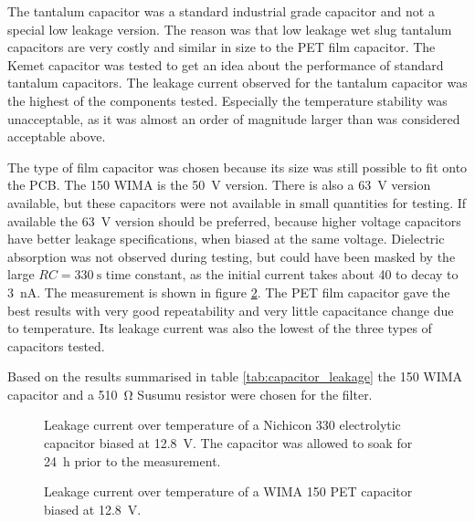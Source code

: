 The tantalum capacitor was a standard industrial grade capacitor and not a special low leakage version. The reason was that low leakage wet slug tantalum capacitors are very costly and similar in size to the PET film capacitor. The Kemet  capacitor was tested to get an idea about the performance of standard tantalum capacitors. The leakage current observed for the tantalum capacitor was the highest of the components tested. Especially the temperature stability was unacceptable, as it was almost an order of magnitude larger than was considered acceptable above.

The type of film capacitor was chosen because its size was still possible to fit onto the PCB. The \qty{150}{\uF} WIMA  is the \qty{50}{\V} version. There is also a \qty{63}{\V} version available, but these capacitors were not available in small quantities for testing. If available the \qty{63}{\V} version should be preferred, because higher voltage capacitors have better leakage specifications, when biased at the same voltage. Dielectric absorption was not observed during testing, but could have been masked by the large $RC = \qty{330}{\s}$ time constant, as the initial current takes about \qty{40}{\min} to decay to \qty{3}{\nA}. The measurement is shown in figure \ref{fig:leakage_current_mks4}. The PET film capacitor gave the best results with very good repeatability and very little capacitance change due to temperature. Its leakage current was also the lowest of the three types of capacitors tested.

Based on the results summarised in table \ref{tab:capacitor_leakage} the \qty{150}{\uF} WIMA  capacitor and a \qty{510}{\ohm} Susumu  resistor were chosen for the filter.

\begin{figure}[ht]
    \centering
    
    \caption{Leakage current over temperature of a Nichicon  \qty{330}{\uF} electrolytic capacitor biased at \qty{12.8}{\V}. The capacitor was allowed to soak for \qty{24}{\hour} prior to the measurement.}
    \label{fig:leakage_current_ukl}
\end{figure}
\clearpage

\begin{figure}[ht]
    \centering
    
    \caption{Leakage current over temperature of a WIMA  \qty{150}{\uF} PET capacitor biased at \qty{12.8}{\V}.}
    \label{fig:leakage_current_mks4}
\end{figure}
\clearpage

